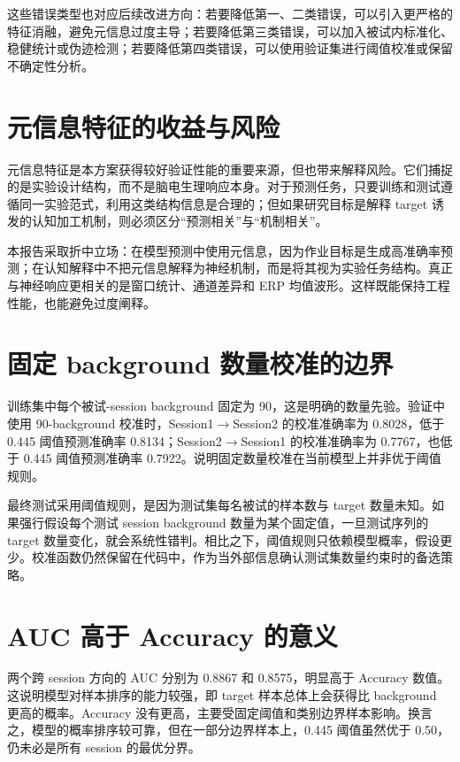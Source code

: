 这些错误类型也对应后续改进方向：若要降低第一、二类错误，可以引入更严格的特征消融，避免元信息过度主导；若要降低第三类错误，可以加入被试内标准化、稳健统计或伪迹检测；若要降低第四类错误，可以使用验证集进行阈值校准或保留不确定性分析。

\section{元信息特征的收益与风险}

元信息特征是本方案获得较好验证性能的重要来源，但也带来解释风险。它们捕捉的是实验设计结构，而不是脑电生理响应本身。对于预测任务，只要训练和测试遵循同一实验范式，利用这类结构信息是合理的；但如果研究目标是解释 target 诱发的认知加工机制，则必须区分“预测相关”与“机制相关”。

本报告采取折中立场：在模型预测中使用元信息，因为作业目标是生成高准确率预测；在认知解释中不把元信息解释为神经机制，而是将其视为实验任务结构。真正与神经响应更相关的是窗口统计、通道差异和 ERP 均值波形。这样既能保持工程性能，也能避免过度阐释。

\section{固定 background 数量校准的边界}

训练集中每个被试-session background 固定为 90，这是明确的数量先验。验证中使用 90-background 校准时，Session1$\rightarrow$Session2 的校准准确率为 0.8028，低于 0.445 阈值预测准确率 0.8134；Session2$\rightarrow$Session1 的校准准确率为 0.7767，也低于 0.445 阈值预测准确率 0.7922。说明固定数量校准在当前模型上并非优于阈值规则。

最终测试采用阈值规则，是因为测试集每名被试的样本数与 target 数量未知。如果强行假设每个测试 session background 数量为某个固定值，一旦测试序列的 target 数量变化，就会系统性错判。相比之下，阈值规则只依赖模型概率，假设更少。校准函数仍然保留在代码中，作为当外部信息确认测试集数量约束时的备选策略。

\section{AUC 高于 Accuracy 的意义}

两个跨 session 方向的 AUC 分别为 0.8867 和 0.8575，明显高于 Accuracy 数值。这说明模型对样本排序的能力较强，即 target 样本总体上会获得比 background 更高的概率。Accuracy 没有更高，主要受固定阈值和类别边界样本影响。换言之，模型的概率排序较可靠，但在一部分边界样本上，0.445 阈值虽然优于 0.50，仍未必是所有 session 的最优分界。

